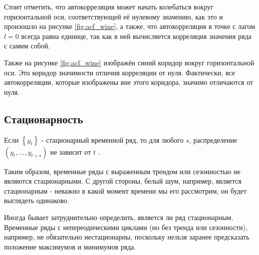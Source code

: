 Стоит отметить, что автокорреляция может начать колебаться вокруг горизонтальной оси, 
соответствующей её нулевому значению, как это и произошло на рисунке \ref{fig:acf_wine}, 
а также, что автокорреляция в точке с лагом $l = 0$ всегда равна единице, 
так как в ней вычисляется корреляция значения ряда с самим собой.

Также на рисунке \ref{fig:acf_wine} изображён синий коридор вокруг горизонтальной оси. 
Это коридор значимости отличия корреляции от нуля. Фактически, все автокорреляции, 
которые изображены вне этого коридора, значимо отличаются от нуля.

\subsection{Стационарность}

\begin{definition}
    Если $\left\{y_t\right\}$ - стационарный временной ряд, то 
    для любого $s$, распределение $(y_t, \dots, y_{t+s})$ не зависит 
    от $t$ \cite{Forecasting_Hyndman}. 
\end{definition}

Таким образом, временные ряды с выраженным трендом или сезонностью не являются стационарными.
С другой стороны, белый шум, например, является стационарным - неважно в какой момент времени 
мы его рассмотрим, он будет выглядеть одинаково.

Иногда бывает затруднительно определить, является ли ряд стационарным. Временные ряды с 
непереодическими циклами (но без тренда или сезонности), например, не обязательно нестационарны, поскольку 
нельзя заранее предсказать положение максимумов и минимумов ряда.

